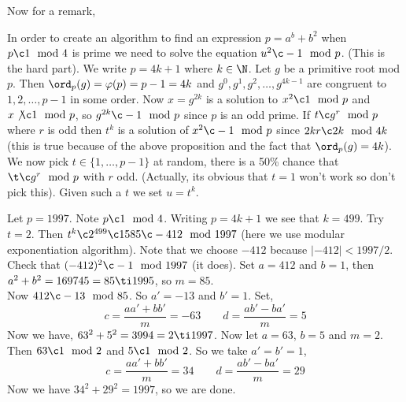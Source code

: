 \noindent
Now for a remark,
\begin{remark}
  In order to create an algorithm to find an expression $p = a^b + b^2$ when $p\c 1 \mod 4$ is prime we need to solve the equation $u^2 \c - 1 \mod p$. (This is the hard part). We write $p = 4k + 1$ where $k \in \N$. Let $g$ be a primitive root mod $p$. Then $\ord_p(g) = \varphi(p) = p - 1 = 4k$ and $g^0, g^1, g^2, \dots, g^{4k-1}$ are congruent to $1, 2, \dots, p - 1$ in some order. Now $x = g^{2k}$
  is a solution to $x^2 \c 1 \mod p$ and $x \not\c 1 \mod p$, so $g^{2k} \c -1 \mod p$ since $p$ is an odd prime. If $t \c g^r \mod p$ where $r$ is odd then $t^k$ is a solution of $x^2 \c - 1\mod p$ since $2kr \c 2k \mod 4k$ (this is true because of the above proposition and the fact that $\ord_p(g) = 4k$).
  We now pick $t \in \{1, \dots, p - 1\}$ at random, there is a 50\% chance that $\t \c g^r \mod p$ with $r$ odd. (Actually, its obvious that $t = 1$ won't work so don't pick this). Given such a $t$ we set $u = t^k$.
\end{remark}

\begin{eg}
  Let $p = 1997$. Note $p \c 1\mod 4$. Writing $p = 4k + 1$ we see that $k = 499$. Try $t = 2$. Then $t^k \c 2^{499} \c 1585 \c -412 \mod 1997$ (here we use modular exponentiation algorithm). Note that we choose $-412$ because $|-412| < 1997/2$. Check that $(-412)^2 \c -1\mod 1997$ (it does). Set $a = 412$ and $b = 1$, then $a^2 + b^2 = 169745 = 85 \ti 1995$, so $m = 85$.\\

  \noindent
  Now $412 \c -13 \mod 85$. So $a' = - 13$ and $b' = 1$. Set,
  $$ c = \frac{aa' + bb'}{m} = -63 \qquad d = \frac{ab' - ba'}{m} = 5 $$
  Now we have, $63^2 + 5^2 = 3994 = 2 \ti 1997$. Now let $a = 63$, $b = 5$ and $m = 2$. Then $63 \c 1 \mod 2$ and $5 \c 1 \mod 2$. So we take $a' = b' = 1$,
  $$ c = \frac{aa' + bb'}{m} = 34 \qquad d = \frac{ab' - ba'}{m} = 29 $$
  Now we have $34^2 + 29^2 = 1997$, so we are done.
\end{eg}